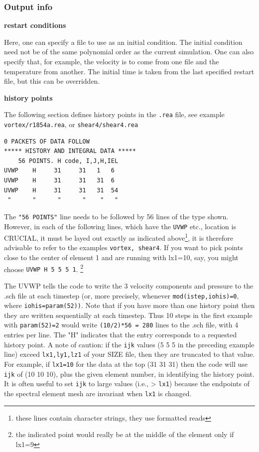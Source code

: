 \subsubsection*{ Output info} 
\begin{description}
\item{\bf restart conditions} 

     Here, one can specify a file to use as an initial condition.
     The initial condition need not be of the same polynomial order
     as the current simulation.   One can also specify that, for example,
     the velocity is to come from one file and the temperature from another.
     The initial time is taken from the last specified restart file, but 
     this can be overridden.
\item{\bf history points}

The following section defines history points in the {\tt .rea} file, see example {\tt vortex/r1854a.rea}, or {\tt shear4/shear4.rea}
\begin{verbatim}
0 PACKETS OF DATA FOLLOW
***** HISTORY AND INTEGRAL DATA *****
    56 POINTS. H code, I,J,H,IEL 
UVWP    H     31     31   1   6
UVWP    H     31     31   31  6
UVWP    H     31     31   31  54
 "      "      "      "    "   "
\end{verbatim}

The {\tt "56 POINTS"} line needs to be followed by 56 lines of the type shown. However, in each of the following lines, which have the {\tt UVWP} etc., location is CRUCIAL, it
must be layed out exactly as indicated above\footnote{these lines contain character strings, they use formatted reads}, it is therefore advisable to refer to the examples {\tt vortex, shear4}.  If you want to pick points close to the center of element 1 and are running with lx1=10, say, you might choose {\tt UVWP H 5 5 5 1}. \footnote{the indicated point would really be at the middle of the element only if lx1=9}

The UVWP tells the code to write the 3 velocity components and pressure to the .sch file at
each timestep (or, more precisely, whenever {\tt mod(istep,iohis)=0}, where {\tt iohis=param(52))}.
Note that if you have more than one history point then they are written sequentially at each
timestep. Thus 10 steps in the first example with {\tt param(52)=2} would write {\tt (10/2)*56 = 280}
lines to the .sch file, with 4 entries per line. The "H" indicates that the entry corresponds to a requested history point. A note of caution: if the {\tt ijk} values (5 5 5 in the preceding example line) exceed {\tt lx1,ly1,lz1} of your SIZE file, then they are truncated to that value. For example, if {\tt lx1=10} for the data at the top (31 31 31) then the code will use {\tt ijk} of (10 10 10), plus the given element number, in identifying the history point. It is often useful to set {\tt ijk} to large values (i.e., > {\tt lx1}) because the endpoints of the spectral element mesh are invariant when {\tt lx1} is changed. 


\end{description}
